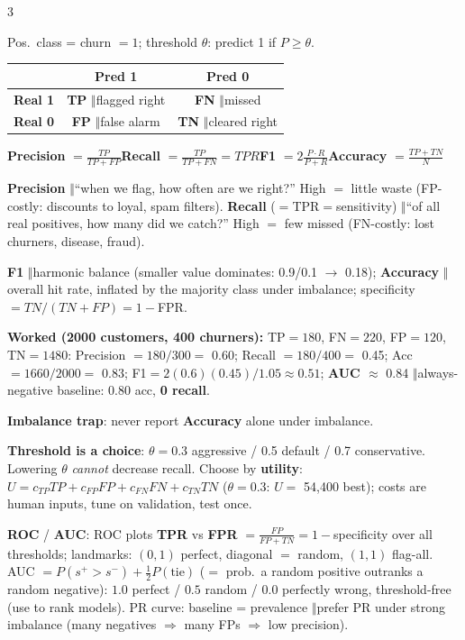 \documentclass[a4paper,fontsize=8pt]{scrartcl}
\newenvironment{ul}{\begin{list}{\textbullet}{\setlength{\leftmargin}{1.05em}\setlength{\labelwidth}{0.6em}\setlength{\labelsep}{0.35em}\setlength{\itemsep}{0.45pt}\setlength{\parsep}{0pt}\setlength{\topsep}{0.65pt}\setlength{\partopsep}{0pt}}}{\end{list}}
\newcommand{\secR}[1]{\vspace{2.4pt}{\colorbox{hdrR}{\color{white}\bfseries\sffamily\scriptsize\ #1\ }}\par\vspace{1.4pt}}
\newcommand{\sep}{\ensuremath{\boldsymbol{\Vert}}}
\newcommand{\key}[1]{\colorbox{hl}{#1}}
\newcommand{\fn}[1]{\colorbox{hlp}{\textbf{#1}}}
\begin{document}
\begin{multicols*}{3}
\secR{L6 · CONFUSION MATRIX / METRICS}
Pos.\ class = churn $=1$; threshold $\theta$: predict 1 if $P\ge\theta$.\\[1pt]
{\footnotesize
\begin{tabular}{@{}l|c|c@{}}
 & \textbf{Pred 1} & \textbf{Pred 0}\\
\hline
\textbf{Real 1} & \textbf{TP} \sep flagged right & \textbf{FN} \sep missed\\
\textbf{Real 0} & \textbf{FP} \sep false alarm & \textbf{TN} \sep cleared right\\
\end{tabular}}
\fn{Precision} $=\frac{TP}{TP+FP}$\quad \fn{Recall} $=\frac{TP}{TP+FN}=TPR$\quad \fn{F1} $=2\frac{P\cdot R}{P+R}$\quad \fn{Accuracy} $=\frac{TP+TN}{N}$
\begin{ul}
\item \fn{Precision} \sep ``when we flag, how often are we right?'' High $=$ little waste (FP-costly: discounts to loyal, spam filters). \fn{Recall} ($=$TPR$=$sensitivity) \sep ``of all real positives, how many did we catch?'' High $=$ few missed (FN-costly: lost churners, disease, fraud).
\item \fn{F1} \sep harmonic balance (smaller value dominates: 0.9/0.1 $\to$ 0.18); \fn{Accuracy} \sep overall hit rate, inflated by the majority class under imbalance; specificity $=TN/(TN+FP)=1-$FPR.
\item \textbf{Worked (2000 customers, 400 churners):} TP$=180$, FN$=220$, FP$=120$, TN$=1480$: Precision $=180/300=$ \key{0.60}; Recall $=180/400=$ \key{0.45}; Acc $=1660/2000=$ \key{0.83}; F1$=2(0.6)(0.45)/1.05\approx0.51$; \textbf{AUC $\approx$} \key{0.84} \sep always-negative baseline: $0.80$ acc, \textbf{0 recall}.
\item \textbf{Imbalance trap}: never report \fn{Accuracy} alone under imbalance.
\item \textbf{Threshold is a choice}: $\theta=0.3$ aggressive / 0.5 default / 0.7 conservative. Lowering $\theta$ \emph{cannot} decrease recall. Choose by \fn{utility}: $U=c_{TP}TP+c_{FP}FP+c_{FN}FN+c_{TN}TN$ ($\theta{=}0.3$: $U=$ \key{54{,}400} best); costs are human inputs, tune on validation, test once.
\item \fn{ROC} / \fn{AUC}: ROC plots \fn{TPR} vs \fn{FPR} $=\frac{FP}{FP+TN}=1-$specificity over all thresholds; landmarks: $(0,1)$ perfect, diagonal $=$ random, $(1,1)$ flag-all. AUC $=P(s^+>s^-)+\frac12P(\text{tie})$ ($=$ prob.\ a random positive outranks a random negative): $1.0$ perfect / $0.5$ random / $0.0$ perfectly wrong, threshold-free (use to rank models). PR curve: baseline = prevalence \sep prefer PR under strong imbalance (many negatives $\Rightarrow$ many FPs $\Rightarrow$ low precision).

\end{ul}
\end{multicols*}
\end{document}
